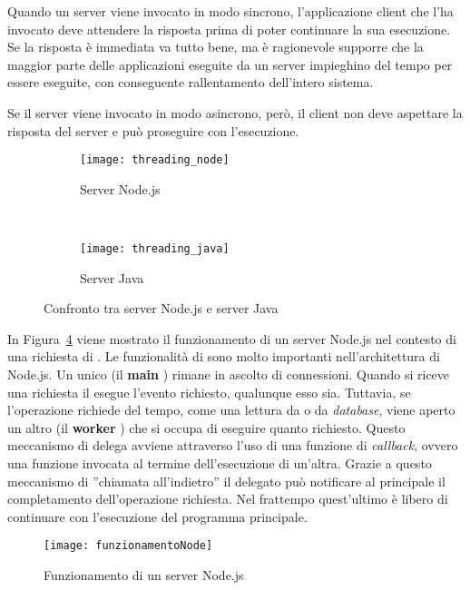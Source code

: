 Quando un server viene invocato in modo sincrono, l'applicazione client che l'ha invocato deve attendere la risposta prima di poter continuare la sua esecuzione. Se la risposta è immediata va tutto bene, ma è ragionevole supporre che la maggior parte delle applicazioni eseguite da un server impieghino del tempo per essere eseguite, con conseguente rallentamento dell'intero sistema.

Se il server viene invocato in modo asincrono, però, il client non deve aspettare la risposta del server e può proseguire con l'esecuzione. 
\begin{figure}[hbpc]
    \begin{center}
    \begin{subfigure}[b]{0.6\textwidth}
        \texttt{[image: threading\_node]}
        \caption{Server Node.js}
        \label{fig:servernode}
    \end{subfigure}
    ~ %
    \begin{subfigure}[b]{0.6\textwidth}
        \texttt{[image: threading\_java]}
        \caption{Server Java}
        \label{fig:serverjava}
    \end{subfigure}
    \caption[Confronto tra server Node.js e server Java]{Confronto tra server Node.js e server Java\protect\footnotemark}\label{fig:confrontoNodeJava}
    \end{center}
\end{figure}

In Figura~\ref{fig:funzionamentoNode} viene mostrato il funzionamento di un server Node.js nel contesto di una richiesta di . Le funzionalità di  sono molto importanti nell'architettura di Node.js. Un unico  (il \textbf{main }) rimane in ascolto di connessioni. Quando si riceve una richiesta il  esegue l'evento richiesto, qualunque esso sia. Tuttavia, se l'operazione richiede del tempo, come una lettura da  o da \textit{database}, viene aperto un altro  (il \textbf{worker }) che si occupa di eseguire quanto richiesto. Questo meccanismo di delega avviene attraverso l'uso di una funzione di \textit{callback}, ovvero una funzione invocata al termine dell'esecuzione di un'altra. Grazie a questo meccanismo di ''chiamata all'indietro'' il  delegato può notificare al  principale il completamento dell'operazione richiesta. Nel frattempo quest'ultimo è libero di continuare con l'esecuzione del programma principale. 
\begin{figure}[h]
\begin{center}
\texttt{[image: funzionamentoNode]}
\caption[Funzionamento di un server Node.js]{Funzionamento di un server Node.js\protect\footnotemark}
\label{fig:funzionamentoNode}
\end{center}
\end{figure}


